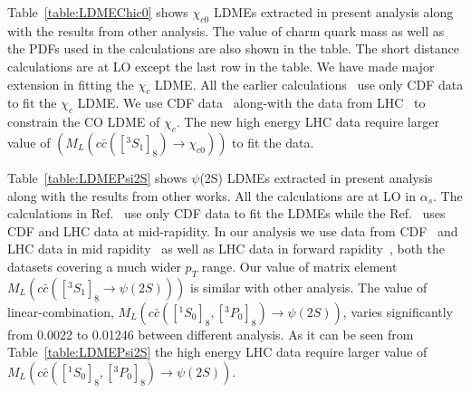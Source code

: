 \documentclass[12pt,a4paper,final]{iopart}
\newcommand{\barc}{{\bar{c}}}
\begin{document}




Table~\ref{table:LDMEChic0} shows $\chi_{c0}$ LDMEs extracted in present analysis along with the results from other
analysis. The value of charm quark mass as well as the PDFs used in the calculations are also shown in the table.
The short distance calculations are at LO except the last row in the table. We have made major extension in fitting
the $\chi_{c}$ LDME. All the earlier calculations~\cite{Cho:1995vh,Braaten:1999qk,Sharma:2012dy} use only CDF data to
fit the $\chi_{c}$ LDME. We use CDF data~\cite{Abe:1997yz} along-with the data from LHC~\cite{ATLAS:2014ala,Chatrchyan:2012ub,Aaij:2013dja} 
to constrain the CO LDME of $\chi_{c}$. The new high energy LHC data require larger value of $(M_{L}(c\barc([^3S_1]_{8})\rightarrow \chi_{c0}))$ to fit the data.  

Table~\ref{table:LDMEPsi2S} shows $\psi$(2S) LDMEs extracted in present analysis along with the results from other 
works. All the calculations are at LO in $\alpha_{s}$. The calculations in Ref.~\cite{Cho:1995vh,Braaten:1999qk,Beneke:1996yw} use only 
CDF data to fit the LDMEs while the Ref.~\cite{Sharma:2012dy} uses CDF and LHC data at mid-rapidity. In our analysis we use data from
CDF~\cite{Abe:1997jz,Acosta:2004yw} and LHC data in mid rapidity~\cite{Chatrchyan:2011kc,Khachatryan:2015rra,Aad:2015duc} as well 
as LHC data in forward rapidity~\cite{Aaij:2012ag}, both the datasets covering a much wider $p_T$ range. Our value of matrix 
element $M_{L}(c\barc([^3S_1]_{8}\rightarrow \psi(2S)))$ is similar with other analysis. The value of linear-combination, 
$M_{L}(c\barc([^1S_0]_{8},[^3P_0]_{8})\rightarrow \psi(2S))$, varies significantly from 0.0022 to
0.01246 between different analysis. As it can be seen from Table~\ref{table:LDMEPsi2S} the high energy LHC data require larger value of
$M_{L}(c\barc([^1S_0]_{8},[^3P_0]_{8})\rightarrow \psi(2S))$.    
\end{document}
